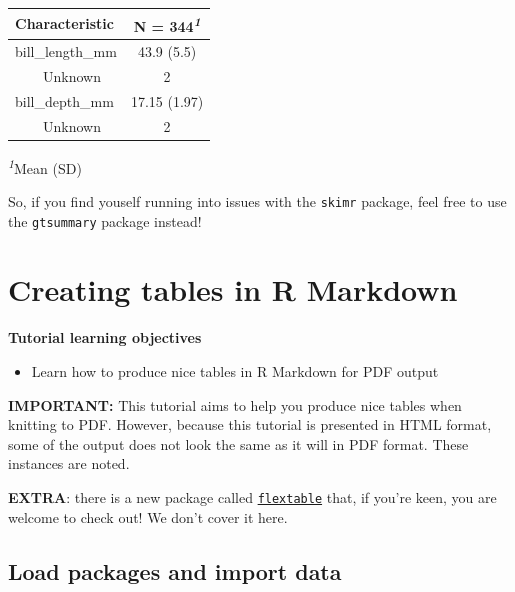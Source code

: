 \documentclass[
]{book}
\providecommand{\tightlist}{%
  \setlength{\itemsep}{0pt}\setlength{\parskip}{0pt}}
\begin{document}
\begin{table}[t]
\fontsize{12.0pt}{14.4pt}\selectfont
\begin{tabular*}{\linewidth}{@{\extracolsep{\fill}}lc}
\toprule
\textbf{Characteristic} & \textbf{N = 344}\textsuperscript{\textit{1}} \\ 
\midrule\addlinespace[2.5pt]
bill\_length\_mm & 43.9 (5.5) \\ 
    Unknown & 2 \\ 
bill\_depth\_mm & 17.15 (1.97) \\ 
    Unknown & 2 \\ 
\bottomrule
\end{tabular*}
\begin{minipage}{\linewidth}
\textsuperscript{\textit{1}}Mean (SD)\\
\end{minipage}
\end{table}

So, if you find youself running into issues with the \texttt{skimr} package, feel free to use the \texttt{gtsummary} package instead!

\chapter*{Creating tables in R Markdown}\label{creating-tables-in-r-markdown}

\textbf{Tutorial learning objectives}

\begin{itemize}
\tightlist
\item
  Learn how to produce nice tables in R Markdown for PDF output
\end{itemize}

\textbf{IMPORTANT: }
This tutorial aims to help you produce nice tables when knitting to PDF. However, because this tutorial is presented in HTML format, some of the output does not look the same as it will in PDF format. These instances are noted.

\textbf{EXTRA}: there is a new package called \href{https://ardata-fr.github.io/flextable-book/index.html}{\texttt{flextable}} that, if you're keen, you are welcome to check out! We don't cover it here.

\section{Load packages and import data}\label{tables_packages}
\end{document}
